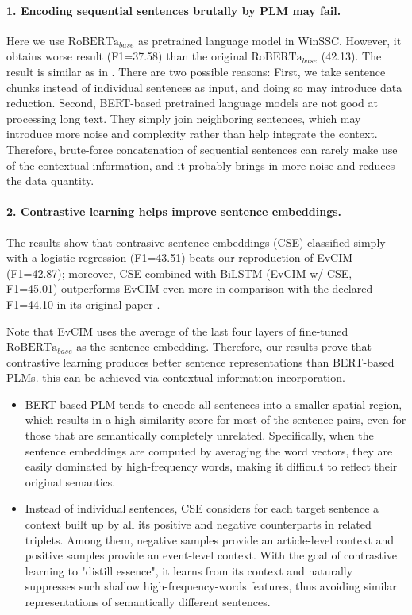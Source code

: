 \documentclass[letterpaper]{article} %
\begin{document}
\paragraph{1. Encoding sequential sentences brutally by PLM may fail.}

Here we use $\text{RoBERTa}_{base}$ as pretrained language model in WinSSC. However, it obtains worse result (F1=37.58) than the original $\text{RoBERTa}_{base}$ (42.13). The result is similar as in \citet{van-den-berg-markert-2020-context}. There are two possible reasons: First, we take sentence chunks instead of individual sentences as input, and doing so may introduce data reduction. Second, BERT-based pretrained language models are not good at processing long text. They simply join neighboring sentences, which may introduce more noise and complexity rather than help integrate the context. Therefore, brute-force concatenation of sequential sentences can rarely make use of the contextual information, and it probably brings in more noise and reduces the data quantity. 

\paragraph{2. Contrastive learning helps improve sentence embeddings.} 

The results show that contrasive sentence embeddings (CSE) classified simply with a logistic regression (F1=43.51) beats our reproduction of EvCIM (F1=42.87); moreover, CSE combined with BiLSTM (EvCIM w/ CSE, F1=45.01) outperforms EvCIM even more in comparison with the declared F1=44.10 in its original paper \citep{cohan-etal-2019-pretrained}. 

Note that EvCIM uses the average of the last four layers of fine-tuned $\text{RoBERTa}_{base}$ as the sentence embedding. Therefore, our results prove that contrastive learning produces better sentence representations than BERT-based PLMs. this can be achieved via contextual information incorporation. 

\begin{itemize}
    \item BERT-based PLM tends to encode all sentences into a smaller spatial region, which results in a high similarity score for most of the sentence pairs, even for those that are semantically completely unrelated. Specifically, when the sentence embeddings are computed by averaging the word vectors, they are easily dominated by high-frequency words, making it difficult to reflect their original semantics.
    \item Instead of individual sentences, CSE considers for each target sentence a context built up by all its positive and negative counterparts in related triplets. Among them, negative samples provide an article-level context and positive samples provide an event-level context. With the goal of contrastive learning to "distill essence", it learns from its context and naturally suppresses such shallow high-frequency-words features, thus avoiding similar representations of semantically different sentences. 
\end{itemize}
\end{document}
